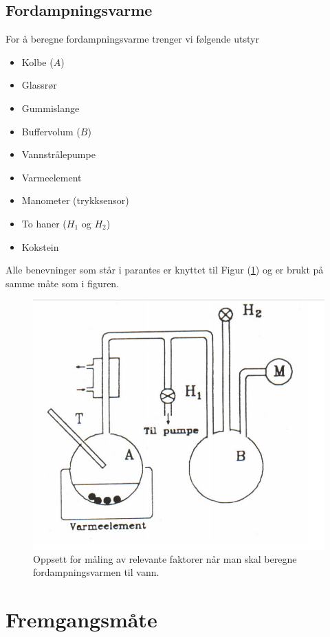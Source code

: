 \documentclass[norsk,a4paper,12pt]{article}
\begin{document}
\subsection{Fordampningsvarme}
For å beregne fordampningsvarme trenger vi følgende utstyr
\begin{itemize}
\item Kolbe ($A$)
\item Glassrør
\item Gummislange
\item Buffervolum ($B$)
\item Vannstrålepumpe
\item Varmeelement
\item Manometer (trykksensor)
\item To haner ($H_1$ og $H_2$)
\item Kokstein
\end{itemize}
Alle benevninger som står i parantes er knyttet til Figur (\ref{fig:fordampningsvarme}) og er brukt på samme måte som i figuren.
\begin{figure}[H]
\centering
\includegraphics[width=120mm]{fordampningsvarme.png}
\caption{Oppsett for måling av relevante faktorer når man skal beregne fordampningsvarmen til vann.}
\label{fig:fordampningsvarme}
\end{figure}

\section{Fremgangsmåte}
\end{document}

